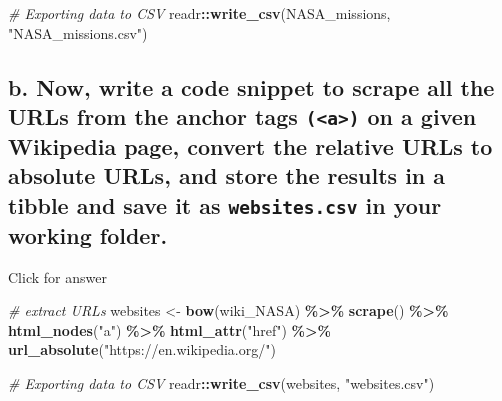\documentclass[
]{book}
\newenvironment{Shaded}{\begin{snugshade}}{\end{snugshade}}
\newcommand{\CommentTok}[1]{\textcolor[rgb]{0.56,0.35,0.01}{\textit{#1}}}
\newcommand{\FunctionTok}[1]{\textcolor[rgb]{0.13,0.29,0.53}{\textbf{#1}}}
\newcommand{\NormalTok}[1]{#1}
\newcommand{\OtherTok}[1]{\textcolor[rgb]{0.56,0.35,0.01}{#1}}
\newcommand{\SpecialCharTok}[1]{\textcolor[rgb]{0.81,0.36,0.00}{\textbf{#1}}}
\newcommand{\StringTok}[1]{\textcolor[rgb]{0.31,0.60,0.02}{#1}}
\begin{document}
\begin{Shaded}
\begin{Highlighting}[]
\CommentTok{\# Exporting data to CSV}
\NormalTok{readr}\SpecialCharTok{::}\FunctionTok{write\_csv}\NormalTok{(NASA\_missions, }\StringTok{"NASA\_missions.csv"}\NormalTok{)}
\end{Highlighting}
\end{Shaded}

\hypertarget{b.-now-write-a-code-snippet-to-scrape-all-the-urls-from-the-anchor-tags-a-on-a-given-wikipedia-page-convert-the-relative-urls-to-absolute-urls-and-store-the-results-in-a-tibble-and-save-it-as-websites.csv-in-your-working-folder.}{%
\subsection{\texorpdfstring{b. Now, write a code snippet to scrape all the URLs from the anchor tags \texttt{(\textless{}a\textgreater{})} on a given Wikipedia page, convert the relative URLs to absolute URLs, and store the results in a tibble and save it as \texttt{websites.csv} in your working folder.}{b. Now, write a code snippet to scrape all the URLs from the anchor tags (\textless a\textgreater) on a given Wikipedia page, convert the relative URLs to absolute URLs, and store the results in a tibble and save it as websites.csv in your working folder.}}\label{b.-now-write-a-code-snippet-to-scrape-all-the-urls-from-the-anchor-tags-a-on-a-given-wikipedia-page-convert-the-relative-urls-to-absolute-urls-and-store-the-results-in-a-tibble-and-save-it-as-websites.csv-in-your-working-folder.}}

Click for answer

\begin{Shaded}
\begin{Highlighting}[]
\CommentTok{\# extract URLs}
\NormalTok{websites }\OtherTok{\textless{}{-}}  \FunctionTok{bow}\NormalTok{(wiki\_NASA) }\SpecialCharTok{\%\textgreater{}\%} \FunctionTok{scrape}\NormalTok{() }\SpecialCharTok{\%\textgreater{}\%} 
  \FunctionTok{html\_nodes}\NormalTok{(}\StringTok{"a"}\NormalTok{) }\SpecialCharTok{\%\textgreater{}\%}
  \FunctionTok{html\_attr}\NormalTok{(}\StringTok{"href"}\NormalTok{) }\SpecialCharTok{\%\textgreater{}\%} 
  \FunctionTok{url\_absolute}\NormalTok{(}\StringTok{"https://en.wikipedia.org/"}\NormalTok{) }
\end{Highlighting}
\end{Shaded}

\begin{Shaded}
\begin{Highlighting}[]
\CommentTok{\# Exporting data to CSV}
\NormalTok{readr}\SpecialCharTok{::}\FunctionTok{write\_csv}\NormalTok{(websites, }\StringTok{"websites.csv"}\NormalTok{)}
\end{Highlighting}
\end{Shaded}
\end{document}

